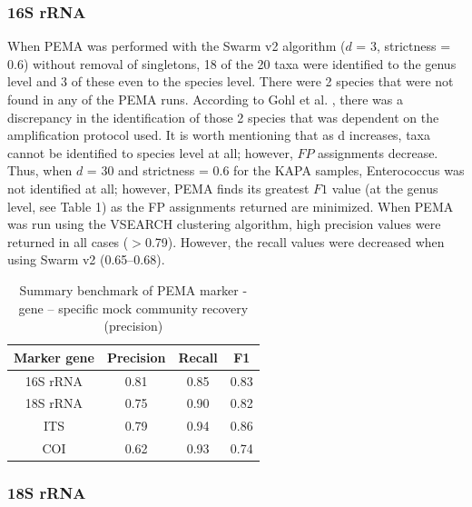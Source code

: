    \subsubsection*{16S rRNA}

   When PEMA was performed with the Swarm v2 algorithm ($d$ = 3, strictness = 0.6) without removal of singletons, 18 of the 20 taxa were identified to the genus level and 3 of these even to the species level. 
   There were 2 species that were not found in any of the PEMA runs. 
   According to Gohl et al. \citep{gohl2016systematic}, there was a discrepancy in the identification of those 2 species that was dependent on the amplification protocol used. 
   It is worth mentioning that as d increases, taxa cannot be identified to species level at all; 
   however, $FP$ assignments decrease. 
   Thus, when $d$ = 30 and strictness = 0.6 for the KAPA samples, Enterococcus was not identified at all; 
   however, PEMA finds its greatest $F1$ value (at the genus level, see Table 1) as the FP assignments returned are minimized. 
   When PEMA was run using the VSEARCH clustering algorithm, high precision values were returned in all cases ($>$0.79). 
   However, the recall values were decreased when using Swarm v2 (0.65–0.68).


   \begin{table}
      \begin{center}
         \begin{tabular}{@{}cccc@{}}
            \toprule
            \multicolumn{1}{c}{\textbf{Marker gene}} & \multicolumn{1}{c}{\textbf{Precision}} & \multicolumn{1}{c}{\textbf{Recall}} & \multicolumn{1}{c}{\textbf{F1}} \\ \midrule
            16S rRNA & 0.81 & 0.85 & 0.83 \\
            18S rRNA & 0.75 & 0.90 & 0.82 \\
            ITS & 0.79 & 0.94 & 0.86 \\
            COI & 0.62 & 0.93 & 0.74
            \end{tabular}
            \caption{Summary benchmark of PEMA marker - gene – specific mock community recovery (precision)}              
      \end{center}
    \end{table}




   \subsubsection*{18S rRNA}

